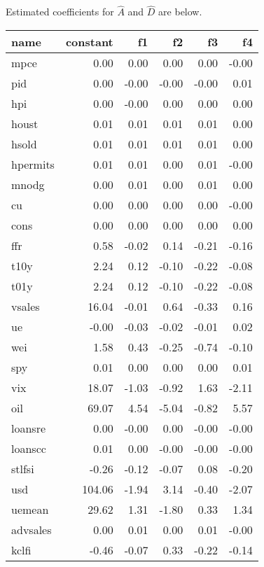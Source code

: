 \documentclass[11pt, letterpaper]{article}\usepackage[]{graphicx}\usepackage[]{color}
\begin{document}
Estimated coefficients for $\widehat{A}$ and $\widehat{D}$ are below.
\begin{table}[H]
\centering
\begingroup\footnotesize
\begin{tabular}{lrrrrr}
  \hline
name & constant & f1 & f2 & f3 & f4 \\ 
  \hline
mpce & 0.00 & 0.00 & 0.00 & 0.00 & -0.00 \\ 
  pid & 0.00 & -0.00 & -0.00 & -0.00 & 0.01 \\ 
  hpi & 0.00 & -0.00 & 0.00 & 0.00 & 0.00 \\ 
  houst & 0.01 & 0.01 & 0.01 & 0.01 & 0.00 \\ 
  hsold & 0.01 & 0.01 & 0.01 & 0.01 & 0.00 \\ 
  hpermits & 0.01 & 0.01 & 0.00 & 0.01 & -0.00 \\ 
  mnodg & 0.00 & 0.01 & 0.00 & 0.01 & 0.00 \\ 
  cu & 0.00 & 0.00 & 0.00 & 0.00 & -0.00 \\ 
  cons & 0.00 & 0.00 & 0.00 & 0.00 & 0.00 \\ 
  ffr & 0.58 & -0.02 & 0.14 & -0.21 & -0.16 \\ 
  t10y & 2.24 & 0.12 & -0.10 & -0.22 & -0.08 \\ 
  t01y & 2.24 & 0.12 & -0.10 & -0.22 & -0.08 \\ 
  vsales & 16.04 & -0.01 & 0.64 & -0.33 & 0.16 \\ 
  ue & -0.00 & -0.03 & -0.02 & -0.01 & 0.02 \\ 
  wei & 1.58 & 0.43 & -0.25 & -0.74 & -0.10 \\ 
  spy & 0.01 & 0.00 & 0.00 & 0.00 & 0.01 \\ 
  vix & 18.07 & -1.03 & -0.92 & 1.63 & -2.11 \\ 
  oil & 69.07 & 4.54 & -5.04 & -0.82 & 5.57 \\ 
  loansre & 0.00 & -0.00 & 0.00 & -0.00 & -0.00 \\ 
  loanscc & 0.01 & 0.00 & -0.00 & -0.00 & -0.00 \\ 
  stlfsi & -0.26 & -0.12 & -0.07 & 0.08 & -0.20 \\ 
  usd & 104.06 & -1.94 & 3.14 & -0.40 & -2.07 \\ 
  uemean & 29.62 & 1.31 & -1.80 & 0.33 & 1.34 \\ 
  advsales & 0.00 & 0.01 & 0.00 & 0.01 & -0.00 \\ 
  kclfi & -0.46 & -0.07 & 0.33 & -0.22 & -0.14 \\ 

\end{tabular}
\end{table}
\end{document}
